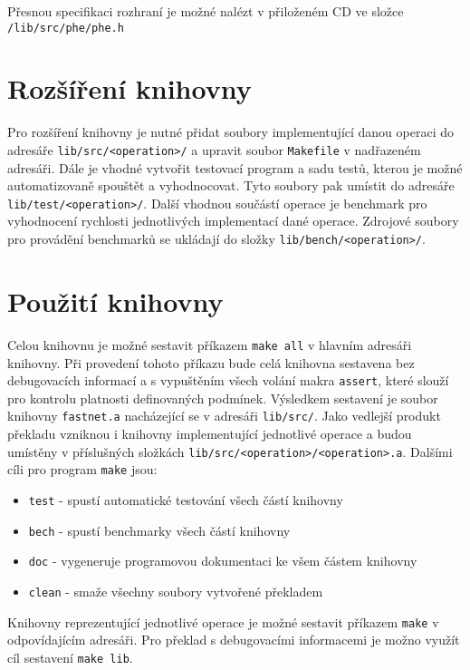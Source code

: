 Přesnou specifikaci rozhraní je možné nalézt v přiloženém CD ve složce \texttt{/lib/src/phe/phe.h}


\section{Rozšíření knihovny}\label{api:extension} %

Pro rozšíření knihovny je nutné přidat soubory implementující danou operaci
do adresáře \texttt{lib/src/<operation>/} a upravit soubor \texttt{Makefile} v nadřazeném adresáři.
Dále je vhodné vytvořit testovací program a sadu testů, kterou je možné automatizovaně spouštět a vyhodnocovat.
Tyto soubory pak umístit do adresáře \texttt{lib/test/<operation>/}.
Další vhodnou součástí operace je benchmark pro vyhodnocení rychlosti jednotlivých
implementací dané operace. Zdrojové soubory pro provádění benchmarků se ukládají do složky \texttt{lib/bench/<operation>/}.

\section{Použití knihovny}\label{api:usage} %
Celou knihovnu je možné sestavit příkazem \texttt{make all} v hlavním adresáři knihovny.
Při provedení tohoto příkazu bude celá knihovna sestavena bez debugovacích informací a s vypuštěním všech
volání makra \texttt{assert}, které slouží pro kontrolu platnosti definovaných podmínek.
Výsledkem sestavení je soubor knihovny \texttt{fastnet.a} nacházející se v adresáři \texttt{lib/src/}.
Jako vedlejší produkt překladu vzniknou i knihovny implementující jednotlivé operace a budou umístěny
v příslušných složkách \texttt{lib/src/<operation>/<operation>.a}.
Dalšími cíli pro program \texttt{make} jsou:

\begin{itemize}
    \item{\texttt{test} - spustí automatické testování všech částí knihovny}
    \item{\texttt{bech} - spustí benchmarky všech částí knihovny}
    \item{\texttt{doc} - vygeneruje programovou dokumentaci ke všem částem knihovny}
    \item{\texttt{clean} - smaže všechny soubory vytvořené překladem}
\end{itemize}

Knihovny reprezentující jednotlivé operace je možné sestavit příkazem \texttt{make}
v odpovídajícím adresáři. Pro překlad s debugovacími informacemi je možno využít cíl sestavení
\texttt{make lib}.

